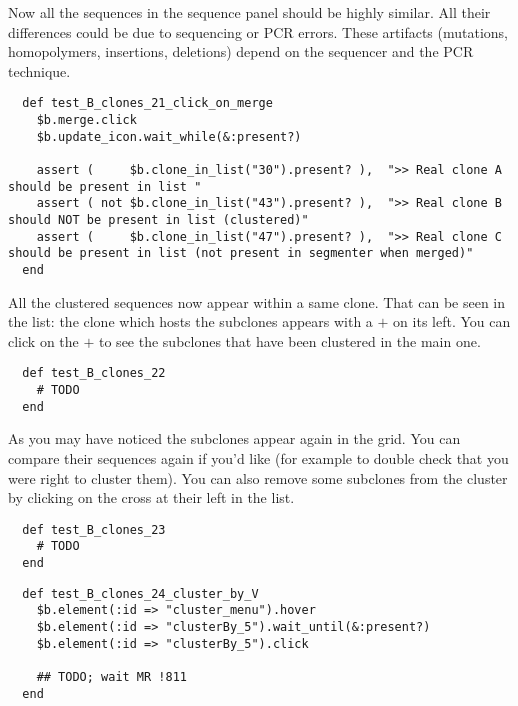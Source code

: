 Now all the sequences in the sequence panel should be highly similar. All their
differences could be due to sequencing or PCR errors.
These artifacts (mutations, homopolymers, insertions, deletions)
depend on the sequencer and the PCR technique.

\begin{verbatim}
  def test_B_clones_21_click_on_merge
    $b.merge.click
    $b.update_icon.wait_while(&:present?)

    assert (     $b.clone_in_list("30").present? ),  ">> Real clone A should be present in list "
    assert ( not $b.clone_in_list("43").present? ),  ">> Real clone B should NOT be present in list (clustered)"
    assert (     $b.clone_in_list("47").present? ),  ">> Real clone C should be present in list (not present in segmenter when merged)"
  end
\end{verbatim}

All the clustered sequences now appear within a same clone. That can be seen
in the list: the clone which hosts the subclones appears with a $+$ on its
left. You can click on the $+$ to see the subclones that have been clustered in
the main one.
\begin{verbatim}
  def test_B_clones_22
    # TODO
  end
\end{verbatim}

As you may have noticed the subclones appear again in the grid. You can
compare their sequences again if you'd like (for example to double check that
you were right to cluster them). You can also remove some subclones from the
cluster by clicking on the cross at their left in the list.
\begin{verbatim}
  def test_B_clones_23
    # TODO
  end
\end{verbatim}

\begin{verbatim}
  def test_B_clones_24_cluster_by_V
    $b.element(:id => "cluster_menu").hover
    $b.element(:id => "clusterBy_5").wait_until(&:present?)
    $b.element(:id => "clusterBy_5").click

    ## TODO; wait MR !811
  end
\end{verbatim}

